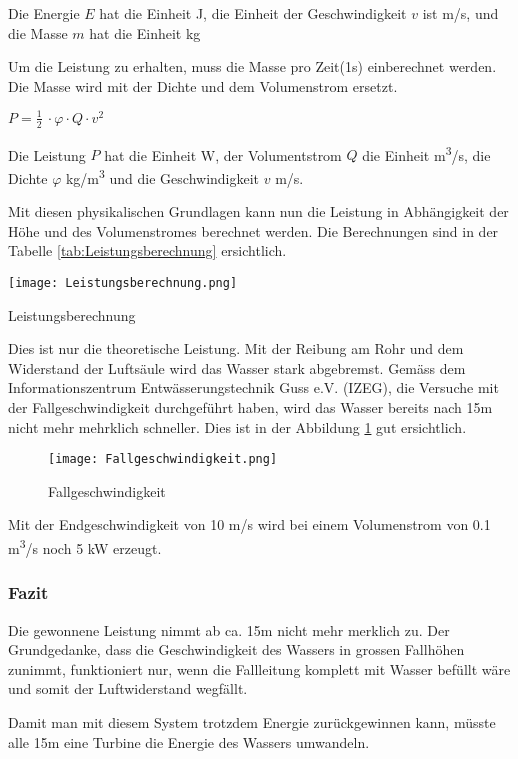 Die Energie \(E\) hat die Einheit \si{J}, die Einheit der Geschwindigkeit \(v\) ist \si{m/s}, und die Masse \(m\) hat die Einheit \si{kg}

Um die Leistung zu erhalten, muss die Masse pro Zeit(1s) einberechnet werden. Die Masse wird mit der Dichte und dem Volumenstrom ersetzt.

\begin{center}
\(P =\frac 12\ \cdot \varphi \cdot Q \cdot v^2\)
\end{center}

Die Leistung \(P\) hat die Einheit \si{W}, der Volumentstrom \(Q\) die Einheit \si{m^3/s}, die Dichte \(\varphi\) \si{kg/m^3} und die Geschwindigkeit \(v\) \si{m/s}.

\bigskip


Mit diesen physikalischen Grundlagen kann nun die Leistung in Abhängigkeit der Höhe und des Volumenstromes berechnet werden. Die Berechnungen sind in der Tabelle \ref{tab:Leistungsberechnung}  ersichtlich.

\begin{table} [H]
	\centering
	\texttt{[image: Leistungsberechnung.png]}
	\caption{Leistungsberechnung}
	\label{tab:Leistungsberechnung}
\end{table}

\newpage

Dies ist nur die theoretische Leistung. Mit der Reibung am Rohr und dem Widerstand der Luftsäule wird das Wasser stark abgebremst. Gemäss dem Informationszentrum Entwässerungstechnik Guss e.V. (IZEG), die Versuche mit der Fallgeschwindigkeit durchgeführt haben, wird das Wasser bereits nach 15\si{m} nicht mehr mehrklich schneller. Dies ist in der Abbildung \ref{fig:Fallgeschwindigkeit}  gut ersichtlich.

\begin{figure} [H]
	\centering
	\texttt{[image: Fallgeschwindigkeit.png]}
	\caption{Fallgeschwindigkeit \cite{Izeg}}
	\label{fig:Fallgeschwindigkeit}
\end{figure}


Mit der Endgeschwindigkeit von 10 \si{m/s} wird bei einem Volumenstrom von 0.1 \si{m^3/s} noch 5 \si{kW} erzeugt.

\subsubsection{Fazit}

Die gewonnene Leistung nimmt ab ca. 15\si{m} nicht mehr merklich zu. Der Grundgedanke, dass die Geschwindigkeit des Wassers in grossen Fallhöhen zunimmt, funktioniert nur, wenn die Fallleitung komplett mit Wasser befüllt wäre und somit der Luftwiderstand wegfällt.

Damit man mit diesem System trotzdem Energie zurückgewinnen kann, müsste alle 15\si{m} eine Turbine die Energie des Wassers umwandeln.

\clearpage 





